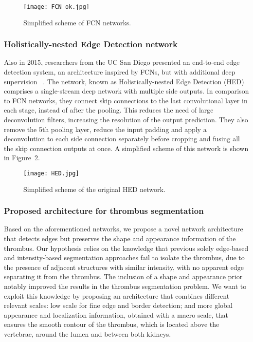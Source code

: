 \documentclass[preprint,authoryear,12pt]{elsarticle}
\begin{document}
\begin{figure}
\centering
\texttt{[image: FCN\_ok.jpg]}
\caption{\label{fig:fcn}Simplified scheme of FCN networks.}
\end{figure}

\subsubsection*{Holistically-nested Edge Detection network}
Also in 2015, researchers from the UC San Diego presented an end-to-end edge detection system, an architecture inspired by FCNs, but with additional deep supervision ~\citep{Xie15}. The network, known as Holistically-nested Edge Detection (HED) comprises a single-stream deep network with multiple side outputs. In comparison to FCN networks, they connect skip connections to the last convolutional layer in each stage, instead of after the pooling. This reduces the need of large deconvolution filters, increasing the resolution of the output prediction. They also remove the 5th pooling layer, reduce the input padding and apply a deconvolution to each side connection separately before cropping and fusing all the skip connection outputs at once. A simplified scheme of this network is shown in Figure~\ref{fig:hed_orig}.\par

\begin{figure}
\centering
\texttt{[image: HED.jpg]}
\caption{\label{fig:hed_orig}Simplified scheme of the original HED network.}
\end{figure}

\subsubsection{Proposed architecture for thrombus segmentation}
Based on the aforementioned networks, we propose a novel network architecture that detects edges but preserves the shape and appearance information of the thrombus. Our hypothesis relies on the knowledge that previous solely edge-based and intensity-based segmentation approaches fail to isolate the thrombus, due to the presence of adjacent structures with similar intensity, with no apparent edge separating it from the thrombus. The inclusion of a shape and appearance prior notably improved the results in the thrombus segmentation problem. We want to exploit this knowledge by proposing an architecture that combines different relevant scales: low scale for fine edge and border detection; and more global appearance and localization information, obtained with a macro scale, that ensures the smooth contour of the thrombus, which is located above the vertebrae, around the lumen and between both kidneys. 
\end{document}
